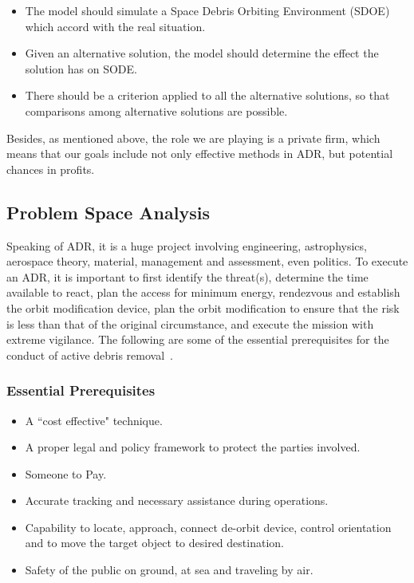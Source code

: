 \documentclass{mcmthesis}
\begin{document}
	\begin{itemize}
		\item The model should simulate a Space Debris Orbiting Environment (SDOE) which accord with the real situation.
		\item Given an alternative solution, the model should determine the effect the solution has on SODE.
		\item There should be a criterion applied to all the alternative solutions, so that comparisons among alternative solutions are possible.
	\end{itemize}
	
	Besides, as mentioned above, the role we are playing is a private firm, which means that our goals include not only effective methods in ADR, but potential chances in profits.
	
\subsection{Problem Space Analysis}\label{Sec-ProblemSpace}
	
	Speaking of ADR, it is a huge project involving engineering, astrophysics, aerospace theory, material, management and assessment, even politics. To execute an ADR, it	is important to first identify the threat(s), determine the time available to react, plan the access for minimum energy, rendezvous and establish the orbit modification device, plan the orbit modification to ensure that the risk is less than that of the original circumstance, and execute the mission with extreme vigilance. The following are some of the essential prerequisites for the conduct of active debris removal~\cite{Jakhu}.
	
\subsubsection{Essential Prerequisites}
	\begin{itemize}
		\item A ``cost effective" technique.
		\item A proper legal and policy framework to protect the parties involved.
		\item Someone to Pay.
		\item Accurate tracking and necessary assistance during operations.
		\item Capability to locate, approach, connect de-orbit device, control orientation and to move the target object to desired destination.
		\item Safety of the public on ground, at sea and traveling by air.
	\end{itemize}
	
\end{document}
